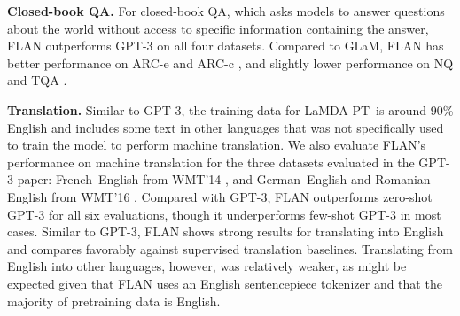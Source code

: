 \documentclass{article} %
\newcommand{\battleshipgrey}[1]{{\color{battleshipgrey}{#1}}}
\newcommand{\flan}{FLAN}
\newcommand{\baselm}{LaMDA-PT}
\begin{document}
\textbf{Closed-book QA.}
For closed-book QA, which asks models to answer questions about the world without access to specific information containing the answer, \flan{} outperforms GPT-3 on all four datasets.
Compared to GLaM, \flan{} has better performance on ARC-e and ARC-c \citep{clark2018think}, and slightly lower performance on NQ \citep{orqa,kwiatkowski2019natural} and TQA \citep{JoshiTriviaQA2017}.

\textbf{Translation.}
Similar to GPT-3, the training data for \baselm\ is around 90\% English and includes some text in other languages that was not specifically used to train the model to perform machine translation. 
We also evaluate \flan's performance on machine translation for the three datasets evaluated in the GPT-3 paper: French--English from WMT'14 \citep{wmt14}, and German--English and Romanian--English from WMT'16 \citep{wmt16}. 
Compared with GPT-3, \flan{} outperforms zero-shot GPT-3 for all six evaluations, though it underperforms few-shot GPT-3 in most cases.
Similar to GPT-3, \flan{} shows strong results for translating into English and compares favorably against supervised translation baselines.
Translating from English into other languages, however, was relatively weaker, as might be expected given that \flan{} uses an English sentencepiece tokenizer and that the majority of pretraining data is English.
 

\newcommand{\flanvalspaced}[4]{
\makecell[l]{\hspace{#4mm}#1\vspace{-1.5mm}\\
{\hspace{#4mm}\battleshipgrey{\tiny std=#2}}\vspace{0.3mm}\\
\hspace{#4mm}{#3}}}
\newcommand{\flanval}[3]{\flanvalspaced{#1}{#2}{#3}{0}}

\newcommand{\gptvalspaced}[4]{\makecell[l]{\hspace{#4mm}#1\vspace{-0.4mm}\\{\hspace{#4mm}\battleshipgrey{\scriptsize #3}}}}
\newcommand{\gptval}[3]{\gptvalspaced{#1}{#2}{#3}{0}}
\end{document}
